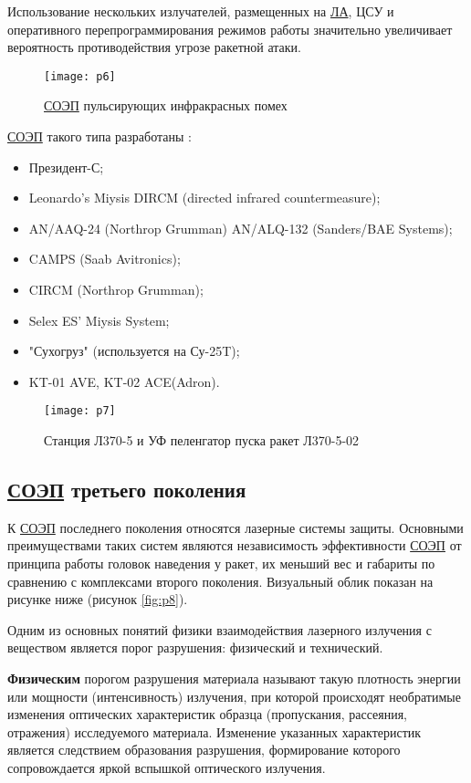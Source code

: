 Использование нескольких излучателей, размещенных на  \hyperref[acroLA]{ЛА}, ЦСУ и оперативного перепрограммирования режимов работы значительно увеличивает вероятность противодействия угрозе ракетной атаки.

\begin{figure}[ht]
	\centering
	\texttt{[image: p6]} 
	\caption{ \hyperref[acroSOEP]{СОЭП} пульсирующих инфракрасных помех}
	\label{fig:p6}
\end{figure}


\hyperref[acroSOEP]{СОЭП} такого типа разработаны \cite[]{Infrared_countermeasure}:
\begin{itemize}
	\item Президент-С;
	\item Leonardo’s Miysis DIRCM (directed infrared countermeasure);
	\item AN/AAQ-24 (Northrop Grumman) AN/ALQ-132 (Sanders/BAE Systems);
	\item CAMPS (Saab Avitronics);
	\item CIRCM (Northrop Grumman);
	\item Selex ES' Miysis System;
	\item "Сухогруз" (используется на Су-25T);
	\item KT-01 AVE, KT-02 ACE(Adron).		
\end{itemize}

\begin{figure}[ht]
	\centering
	\texttt{[image: p7]} 
	\caption{Станция Л370-5 и УФ пеленгатор пуска ракет Л370-5-02}
	\label{fig:p7}
\end{figure}

\subsection{ \hyperref[acroSOEP]{СОЭП} третьего поколения}	
К  \hyperref[acroSOEP]{СОЭП} последнего поколения относятся лазерные системы защиты. Основными преимуществами таких систем являются независимость эффективности \hyperref[acroSOEP]{СОЭП} от принципа работы головок наведения у ракет, их меньший вес и габариты по сравнению с комплексами второго поколения. Визуальный облик показан на рисунке ниже (рисунок \ref{fig:p8}).

Одним из основных понятий физики взаимодействия лазерного излучения с веществом является порог разрушения: физический и технический. 

\textbf{Физическим} порогом разрушения материала называют такую плотность энергии или мощности (интенсивность) излучения, при которой происходят необратимые изменения оптических характеристик образца (пропускания, рассеяния, отражения) исследуемого материала. Изменение указанных характеристик является следствием образования разрушения, формирование которого сопровождается яркой вспышкой оптического излучения. 

